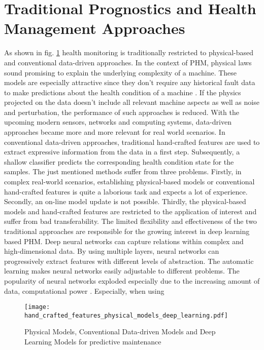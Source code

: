 \section{Traditional Prognostics and Health Management Approaches}
As shown in fig. \ref{fig:hand_crafted_features_physical_models_deep_learning} health monitoring is traditionally restricted to physical-based and conventional data-driven approaches. In the context of PHM, physical laws sound promising to explain the underlying complexity of a machine. These models are especially attractive since they don't require any historical fault data to make predictions about the health condition of a machine \cite{AN201942}. If the physics projected on the data doesn't include all relevant machine aspects as well as noise and perturbation, the performance of such approaches is reduced. With the upcoming modern sensors, networks and computing systems, data-driven approaches became more and more relevant for real world scenarios. In conventional data-driven approaches, traditional hand-crafted features are used to extract expressive information from the data in a first step. Subsequently, a shallow classifier predicts the corresponding health condition state for the samples. The just mentioned methods suffer from three problems. Firstly, in complex real-world scenarios, establishing physical-based models or conventional hand-crafted features is quite a laborious task and expects a lot of experience. Secondly, an on-line model update is not possible. Thirdly, the physical-based models and hand-crafted features are restricted to the application of interest and suffer from bad transferability. The limited flexibility and effectiveness of the two traditional approaches are responsible for the growing interest in deep learning based PHM. Deep neural networks can capture relations within complex and high-dimensional data. By using multiple layers, neural networks can progressively extract features with different levels of abstraction. The automatic learning makes neural networks easily adjustable to different problems. The popularity of neural networks exploded especially due to the increasing amount of data, computational power \cite{ZHAO2019213} \cite{AZAMFAR2020103932}. Especially, when using 

\begin{figure}[H]
  \centering
  \texttt{[image: hand\_crafted\_features\_physical\_models\_deep\_learning.pdf]}
  \caption {Physical Models, Conventional Data-driven Models and Deep Learning Models for predictive maintenance \cite{ZHAO2019213}} \label{fig:hand_crafted_features_physical_models_deep_learning}
\end{figure}